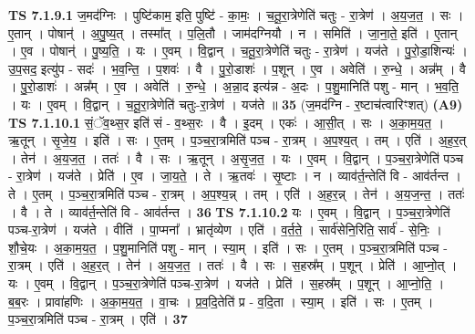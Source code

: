 \documentclass[17pt]{extarticle}
\begin{document}
                                \textbf{ TS 7.1.9.1} \newline
                  ज॒मद॑ग्निः । पुष्टि॑काम॒ इति॒ पुष्टि॑ - का॒मः॒ । च॒तू॒रा॒त्रेणेति॑ चतुः - रा॒त्रेण॑ । अ॒य॒ज॒त॒ । सः । ए॒तान् । पोषान्॑ । अ॒पु॒ष्य॒त् । तस्मा᳚त् । प॒लि॒तौ । जाम॑दग्नियौ । न । समिति॑ । जा॒ना॒ते॒ इति॑ । ए॒तान् । ए॒व । पोषान्॑ । पु॒ष्य॒ति॒ । यः । ए॒वम् । वि॒द्वान् । च॒तू॒रा॒त्रेणेति॑ चतुः - रा॒त्रेण॑ । यज॑ते । पु॒रो॒डा॒शिन्यः॑ । उ॒प॒सद॒ इत्यु॑प - सदः॑ । भ॒व॒न्ति॒ । प॒शवः॑ । वै । पु॒रो॒डाशः॑ । प॒शून् । ए॒व । अवेति॑ । रु॒न्धे॒ । अन्न᳚म् । वै । पु॒रो॒डाशः॑ । अन्न᳚म् । ए॒व । अवेति॑ । रु॒न्धे॒ । अ॒न्ना॒द इत्य॑न्न - अ॒दः । प॒शु॒मानिति॑ पशु - मान् । भ॒व॒ति॒ । यः । ए॒वम् । वि॒द्वान् । च॒तू॒रा॒त्रेणेति॑ चतुः-रा॒त्रेण॑ । यज॑ते ॥ \textbf{  35} \newline
                  \newline
                      (ज॒मद॑ग्नि - र॒ष्टाच॑त्वारिꣳशत्)  \textbf{(A9)} \newline \newline
                                \textbf{ TS 7.1.10.1} \newline
                  सं॒ॅव॒थ्स॒र इति॑ सं - व॒थ्स॒रः । वै । इ॒दम् । एकः॑ । आ॒सी॒त् । सः । अ॒का॒म॒य॒त॒ । ऋ॒तून् । सृ॒जे॒य॒ । इति॑ । सः । ए॒तम् । प॒ञ्च॒रा॒त्रमिति॑ पञ्च - रा॒त्रम् । अ॒प॒श्य॒त् । तम् । एति॑ । अ॒ह॒र॒त् । तेन॑ । अ॒य॒ज॒त॒ । ततः॑ । वै । सः । ऋ॒तून् । अ॒सृ॒ज॒त॒ । यः । ए॒वम् । वि॒द्वान् । प॒ञ्च॒रा॒त्रेणेति॑ पञ्च - रा॒त्रेण॑ । यज॑ते । प्रेति॑ । ए॒व । जा॒य॒ते॒ । ते । ऋ॒तवः॑ । सृ॒ष्टाः । न । व्याव॑र्त॒न्तेति॑ वि - आव॑र्तन्त । ते । ए॒तम् । प॒ञ्च॒रा॒त्रमिति॑ पञ्च - रा॒त्रम् । अ॒प॒श्य॒न्न् । तम् । एति॑ । अ॒ह॒र॒न्न् । तेन॑ । अ॒य॒ज॒न्त॒ । ततः॑ । वै । ते । व्याव॑र्त॒न्तेति॑ वि - आव॑र्तन्त । \textbf{  36} \newline
                  \newline
                                \textbf{ TS 7.1.10.2} \newline
                  यः । ए॒वम् । वि॒द्वान् । प॒ञ्च॒रा॒त्रेणेति॑ पञ्च-रा॒त्रेण॑ । यज॑ते । वीति॑ । पा॒प्मना᳚ । भ्रातृ॑व्येण । एति॑ । व॒र्त॒ते॒ । सार्व॑सेनि॒रिति॒ सार्व॑ - से॒निः॒ । शौ॒चे॒यः । अ॒का॒म॒य॒त॒ । प॒शु॒मानिति॑ पशु - मान् । स्या॒म् । इति॑ । सः । ए॒तम् । प॒ञ्च॒रा॒त्रमिति॑ पञ्च - रा॒त्रम् । एति॑ । अ॒ह॒र॒त् । तेन॑ । अ॒य॒ज॒त॒ । ततः॑ । वै । सः । स॒हस्र᳚म् । प॒शून् । प्रेति॑ । आ॒प्नो॒त् । यः । ए॒वम् । वि॒द्वान् । प॒ञ्च॒रा॒त्रेणेति॑ पञ्च-रा॒त्रेण॑ । यज॑ते । प्रेति॑ । स॒हस्र᳚म् । प॒शून् । आ॒प्नो॒ति॒ । ब॒ब॒रः । प्रावा॑हणिः । अ॒का॒म॒य॒त॒ । वा॒चः । प्र॒व॒दि॒तेति॑ प्र - व॒दि॒ता । स्या॒म् । इति॑ । सः । ए॒तम् । प॒ञ्च॒रा॒त्रमिति॑ पञ्च - रा॒त्रम् । एति॑ । \textbf{  37} \newline
\end{document}
